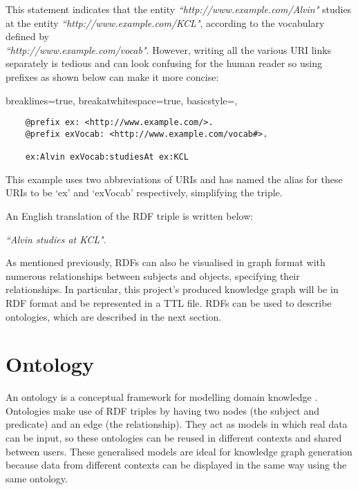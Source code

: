 This statement indicates that the entity \textit{``http://www.example.com/Alvin"} studies at the entity \textit{``http://www.example.com/KCL"}, according to the vocabulary defined by \\\textit{``http://www.example.com/vocab"}. However, writing all the various URI links separately is tedious and can look confusing for the human reader so using prefixes as shown below can make it more concise:

\vspace{-0.2cm}
\lstset
{
    breaklines=true,
    breakatwhitespace=true,
    basicstyle=\linespread{1.5}\ttfamily,
}
\begin{center}
\begin{lstlisting}
    @prefix ex: <http://www.example.com/>. 
    @prefix exVocab: <http://www.example.com/vocab#>. 

    ex:Alvin exVocab:studiesAt ex:KCL
\end{lstlisting}
\end{center} 
\vspace{-0.2cm}

This example uses two abbreviations of URIs and has named the alias for these URIs to be `ex' and `exVocab' respectively, simplifying the triple. 

An English translation of the RDF triple is written below: 

\vspace{-0.1cm}
\begin{center}
    \textit{``Alvin studies at KCL".}
\end{center}
\vspace{-0.1cm}

As mentioned previously, RDFs can also be visualised in graph format with numerous relationships between subjects and objects, specifying their relationships. In particular, this project's produced knowledge graph will be in RDF format and be represented in a TTL file. RDFs can be used to describe ontologies, which are described in the next section.

\section{Ontology}
\hspace{0.5cm} An ontology is a conceptual framework for modelling domain knowledge \cite{ontology}. Ontologies make use of RDF triples by having two nodes (the subject and predicate) and an edge (the relationship). They act as models in which real data can be input, so these ontologies can be reused in different contexts and shared between users. These generalised models are ideal for knowledge graph generation because data from different contexts can be displayed in the same way using the same ontology. 

